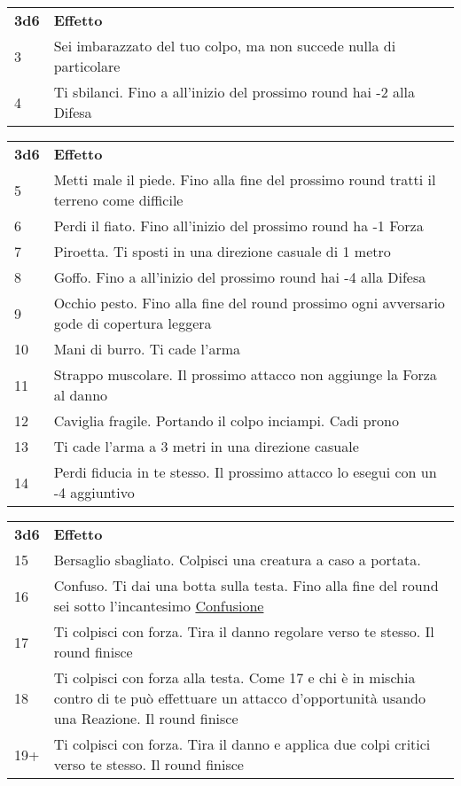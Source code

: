 {{\begin{multicols}{2}
\begin{tabularx}{0.5\textwidth}{l|X}
\textbf{3d6} & \textbf{Effetto}\\
3& Sei imbarazzato del tuo colpo, ma non succede nulla di particolare\\
4& Ti sbilanci. Fino a all'inizio del prossimo round hai -2 alla Difesa\\
\end{tabularx}
\begin{tabularx}{0.5\textwidth}{l|X}
\textbf{3d6} & \textbf{Effetto}\\
5& Metti male il piede. Fino alla fine del prossimo round tratti il terreno come difficile\\
6& Perdi il fiato. Fino all'inizio del prossimo round ha -1 Forza\\
7& Piroetta. Ti sposti in una direzione casuale di 1 metro\\
8& Goffo. Fino a all'inizio del prossimo round hai -4 alla Difesa\\
9& Occhio pesto. Fino alla fine del round prossimo ogni avversario gode di copertura leggera\\
10 & Mani di burro. Ti cade l'arma\\
11 & Strappo muscolare. Il prossimo attacco non aggiunge la Forza al danno\\
12 & Caviglia fragile. Portando il colpo inciampi. Cadi prono\\
13 & Ti cade l'arma a 3 metri in una direzione casuale\\
14 & Perdi fiducia in te stesso. Il prossimo attacco lo esegui con un -4 aggiuntivo\\
\end{tabularx}
\begin{tabularx}{0.5\textwidth}{l|X}
\textbf{3d6} & \textbf{Effetto}\\
15 & Bersaglio sbagliato. Colpisci una creatura a caso a portata.\\
16 & Confuso. Ti dai una botta sulla testa. Fino alla fine del round sei sotto l'incantesimo \hyperlink{Confusione}{Confusione}\\
17 & Ti colpisci con forza. Tira il danno regolare verso te stesso. Il round finisce\\
18 & Ti colpisci con forza alla testa. Come 17 e chi è in mischia contro di te può effettuare un attacco d'opportunità usando una Reazione. Il round finisce\\
19+& Ti colpisci con forza. Tira il danno e applica due colpi critici verso te stesso. Il round finisce
\end{tabularx}


\end{multicols}}}
